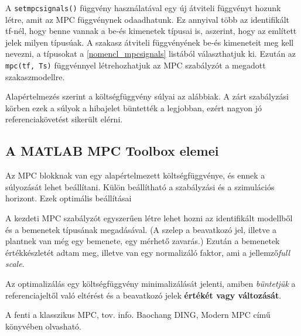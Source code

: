 
A \verb|setmpcsignals()| függvény használatával egy új átviteli függvényt hozunk létre, amit az MPC függvénynek odaadhatunk. Ez annyival több az identifikált tf-nél, hogy benne vannak a be-és kimenetek típusai is, aszerint, hogy az említett jelek milyen típusúak. A szakasz átviteli függvényének be-és kimeneteit meg kell nevezni, a típusokat a \ref{nomencl_mpcsignals} listából választhatjuk ki. Ezután az \verb|mpc(tf, Ts)| függvénnyel létrehozhatjuk az MPC szabályzót a megadott szakaszmodellre.

Alapértelmezés szerint a költségfüggvény súlyai az alábbiak. A zárt szabályzási körben ezek a súlyok a hibajelet büntették a legjobban, ezért nagyon jó referenciakövetést sikerült elérni.





\subsection{A MATLAB MPC Toolbox elemei}
Az MPC blokknak van egy alapértelmezett költségfüggvénye, és ennek a súlyozását lehet beállítani.
Külön beállítható a szabályzási és a szimulációs horizont.
Ezek optimális beállításai 

A kezdeti MPC szabályzót egyszerűen létre lehet hozni az identifikált modellből és a bemenetek típusának megadásával. (A szelep a beavatkozó jel, illetve a plantnek van még egy bemenete, egy mérhető zavarás.) Ezután a bemenetek értékkészletét adtam meg, illetve van egy normalizáló faktor, ami a jellemző\textit{full scale}.

Az optimalizálás egy költségfüggvény minimalizálását jelenti, amiben \textit{büntetjük} a referenciajeltől való eltérést és a beavatkozó jelek \textbf{értékét vagy változását}.

A fenti a klasszikus MPC, tov. info. Baochang DING, Modern MPC című könyvében olvasható.


